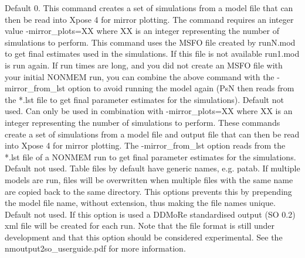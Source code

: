 \begin{optionlist}
\nextopt
{}
Default 0. This command creates a set of simulations from a model file that can then be read into Xpose 4 for mirror plotting. The command requires an integer value -mirror\_plots=XX where XX is an integer representing the number of simulations to perform. This command uses the MSFO file created by runN.mod to get final estimates used in the simulations. If this file is not available run1.mod is run again.  If run times are long, and you did not create an MSFO file with your initial NONMEM run, you can combine the above command with the -mirror\_from\_lst option to avoid running the model again (PsN then reads from the *.lst file to get final parameter estimates for the simulations). 
\nextopt
{}
Default not used. Can only be used in combination with -mirror\_plots=XX where XX is an integer representing the number of simulations to perform.  These commands create a set of simulations from a model file and output file that can then be read into Xpose 4 for mirror plotting.  The -mirror\_from\_lst option reads from the *.lst file of a NONMEM run to get final parameter estimates for the simulations. 
\nextopt
{}
Default not used. Table files by default have generic names, e.g. patab. If multiple models are run, files will be overwritten when multiple files with the same name are copied back to the same directory. This options prevents this by prepending the model file name, without extension, thus making the file names unique. 
\nextopt
{}
Default not used. If this option is used a DDMoRe standardised output (SO 0.2) xml file will be created for each run. Note that the file format is still under development and that this option should be considered experimental. See the \mbox{nmoutput2so\_userguide.pdf} for more information.
\nextopt
\end{optionlist}
